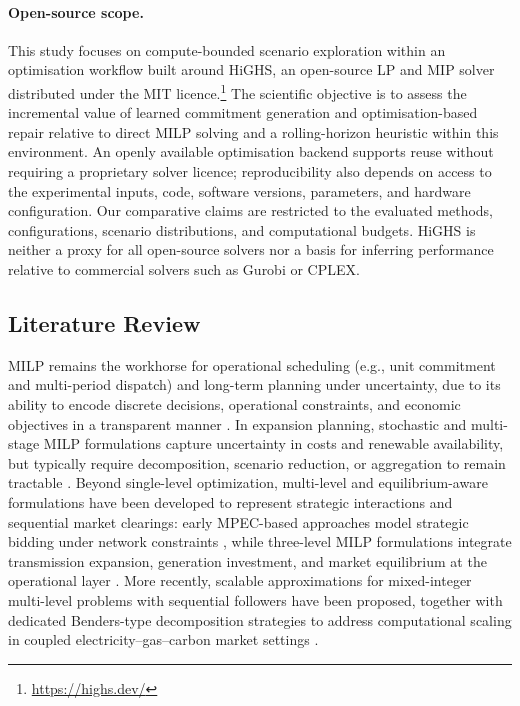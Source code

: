 \documentclass{article}
\let\parencite\citep
\begin{document}
\paragraph{Open-source scope.}
This study focuses on compute-bounded scenario exploration within an optimisation workflow built around HiGHS, an open-source LP and MIP solver distributed under the MIT licence.\footnote{\url{https://highs.dev/}} The scientific objective is to assess the incremental value of learned commitment generation and optimisation-based repair relative to direct MILP solving and a rolling-horizon heuristic within this environment. An openly available optimisation backend supports reuse without requiring a proprietary solver licence; reproducibility also depends on access to the experimental inputs, code, software versions, parameters, and hardware configuration. Our comparative claims are restricted to the evaluated methods, configurations, scenario distributions, and computational budgets. HiGHS is neither a proxy for all open-source solvers nor a basis for inferring performance relative to commercial solvers such as Gurobi or CPLEX.


\subsection{Literature Review}

MILP remains the workhorse for operational scheduling (e.g., unit commitment and multi-period dispatch) and long-term planning under uncertainty, due to its ability to encode discrete decisions, operational constraints, and economic objectives in a transparent manner \parencite{conejo_investment_2016}. In expansion planning, stochastic and multi-stage MILP formulations capture uncertainty in costs and renewable availability, but typically require decomposition, scenario reduction, or aggregation to remain tractable \parencite{micheli_two-stage_2023}. Beyond single-level optimization, multi-level and equilibrium-aware formulations have been developed to represent strategic interactions and sequential market clearings: early MPEC-based approaches model strategic bidding under network constraints \parencite{hobbs_strategic_2000}, while three-level MILP formulations integrate transmission expansion, generation investment, and market equilibrium at the operational layer \parencite{pozo_three-level_2013}. More recently, scalable approximations for mixed-integer multi-level problems with sequential followers have been proposed, together with dedicated Benders-type decomposition strategies to address computational scaling in coupled electricity--gas--carbon market settings \parencite{xia_scalable_2025}.
\end{document}
